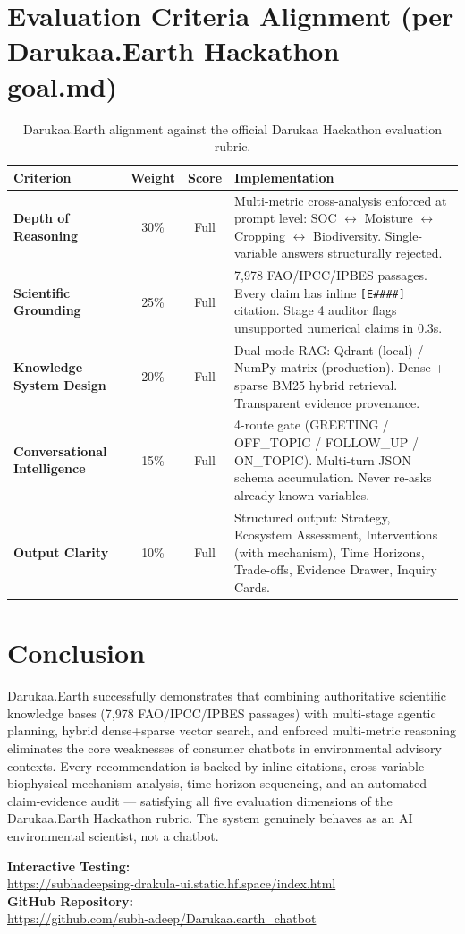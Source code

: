 \documentclass[11pt,a4paper]{article}
\begin{document}
\section{Evaluation Criteria Alignment (per Darukaa.Earth Hackathon goal.md)}

\begin{table}[h!]
\centering
\small
\begin{tabularx}{\textwidth}{Xcc X}
\toprule
\textbf{Criterion} & \textbf{Weight} & \textbf{Score} & \textbf{Implementation} \\
\midrule
\textbf{Depth of Reasoning} & 30\% & Full &
Multi-metric cross-analysis enforced at prompt level:
SOC $\leftrightarrow$ Moisture $\leftrightarrow$ Cropping $\leftrightarrow$ Biodiversity.
Single-variable answers structurally rejected. \\
\addlinespace
\textbf{Scientific Grounding} & 25\% & Full &
7,978 FAO/IPCC/IPBES passages. Every claim has inline \texttt{[E\#\#\#\#]} citation.
Stage 4 auditor flags unsupported numerical claims in 0.3s. \\
\addlinespace
\textbf{Knowledge System Design} & 20\% & Full &
Dual-mode RAG: Qdrant (local) / NumPy matrix (production).
Dense + sparse BM25 hybrid retrieval. Transparent evidence provenance. \\
\addlinespace
\textbf{Conversational Intelligence} & 15\% & Full &
4-route gate (GREETING / OFF\_TOPIC / FOLLOW\_UP / ON\_TOPIC).
Multi-turn JSON schema accumulation. Never re-asks already-known variables. \\
\addlinespace
\textbf{Output Clarity} & 10\% & Full &
Structured output: Strategy, Ecosystem Assessment, Interventions (with mechanism),
Time Horizons, Trade-offs, Evidence Drawer, Inquiry Cards. \\
\bottomrule
\end{tabularx}
\caption{Darukaa.Earth alignment against the official Darukaa Hackathon evaluation rubric.}
\end{table}

\section{Conclusion}
Darukaa.Earth successfully demonstrates that combining authoritative scientific knowledge bases (7,978 FAO/IPCC/IPBES passages) with multi-stage agentic planning, hybrid dense+sparse vector search, and enforced multi-metric reasoning eliminates the core weaknesses of consumer chatbots in environmental advisory contexts. Every recommendation is backed by inline citations, cross-variable biophysical mechanism analysis, time-horizon sequencing, and an automated claim-evidence audit — satisfying all five evaluation dimensions of the Darukaa.Earth Hackathon rubric. The system genuinely behaves as an AI environmental scientist, not a chatbot.

\vspace{1em}
\begin{tcolorbox}[colback=boxbg,colframe=primary]
\textbf{Interactive Testing:}\\
\url{https://subhadeepsing-drakula-ui.static.hf.space/index.html}\\[4pt]
\textbf{GitHub Repository:}\\
\url{https://github.com/subh-adeep/Darukaa.earth_chatbot}
\end{tcolorbox}
\end{document}
